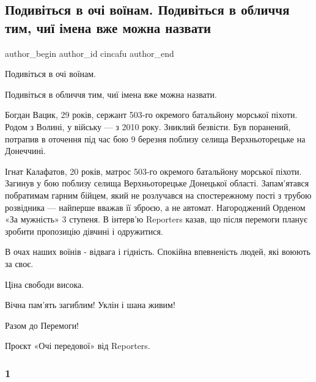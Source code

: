  
 
 
 
 
 
\subsection{Подивіться в очі воїнам. Подивіться в обличчя тим, чиї імена вже можна назвати}
\label{sec:21_04_2022.fb.cincafu.1.voiny}
 
\ifcmt
 author_begin
   author_id cincafu
 author_end
\fi

Подивіться в очі воїнам. 

Подивіться в обличчя тим, чиї імена вже можна назвати. 

Богдан Вацик, 29 років, сержант 503-го окремого батальйону морської піхоти.
Родом з Волині, у війську — з 2010 року. Зниклий безвісти. Був поранений,
потрапив в оточення під час бою 9 березня поблизу селища Верхньоторецьке на
Донеччині.

Ігнат Калафатов, 20 років, матрос 503-го окремого батальйону морської піхоти.
Загинув у бою поблизу селища Верхньоторецьке Донецької області. Запам'ятався
побратимам гарним бійцем, який не розлучався на спостережному пості з трубою
розвідника — найперше вважав її зброєю, а не автомат. Нагороджений Орденом «За
мужність» 3 ступеня. В інтерв'ю Reporters казав, що після перемоги планує
зробити пропозицію дівчині і одружитися.

В очах наших воїнів - відвага і гідність. Спокійна впевненість людей, які
воюють за своє.

Ціна свободи висока. 

Вічна пам'ять загиблим! Уклін і шана живим! 

Разом до Перемоги!

Проєкт «Очі передової» від Reporters.

\subsubsection{1}


